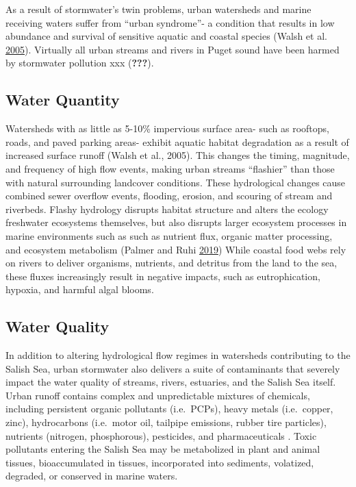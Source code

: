 \documentclass[
]{report}
\begin{document}
As a result of stormwater's twin problems, urban watersheds and marine receiving waters suffer from ``urban syndrome''- a condition that results in low abundance and survival of sensitive aquatic and coastal species (Walsh et al. \protect\hyperlink{ref-Walsh2005}{2005}). Virtually all urban streams and rivers in Puget sound have been harmed by stormwater pollution xxx ({\textbf{???}}).

\hypertarget{water-quantity}{%
\subsection{Water Quantity}\label{water-quantity}}

Watersheds with as little as 5-10\% impervious surface area- such as rooftops, roads, and paved parking areas- exhibit aquatic habitat degradation as a result of increased surface runoff (Walsh et al., 2005). This changes the timing, magnitude, and frequency of high flow events, making urban streams ``flashier'' than those with natural surrounding landcover conditions. These hydrological changes cause combined sewer overflow events, flooding, erosion, and scouring of stream and riverbeds. Flashy hydrology disrupts habitat structure and alters the ecology freshwater ecosystems themselves, but also disrupts larger ecosystem processes in marine environments such as such as nutrient flux, organic matter processing, and ecosystem metabolism (Palmer and Ruhi \protect\hyperlink{ref-Palmer2019}{2019}) While coastal food webs rely on rivers to deliver organisms, nutrients, and detritus from the land to the sea, these fluxes increasingly result in negative impacts, such as eutrophication, hypoxia, and harmful algal blooms.

\hypertarget{water-quality}{%
\subsection{Water Quality}\label{water-quality}}

In addition to altering hydrological flow regimes in watersheds contributing to the Salish Sea, urban stormwater also delivers a suite of contaminants that severely impact the water quality of streams, rivers, estuaries, and the Salish Sea itself. Urban runoff contains complex and unpredictable mixtures of chemicals, including persistent organic pollutants (i.e.~PCPs), heavy metals (i.e.~copper, zinc), hydrocarbons (i.e.~motor oil, tailpipe emissions, rubber tire particles), nutrients (nitrogen, phosphorous), pesticides, and pharmaceuticals . Toxic pollutants entering the Salish Sea may be metabolized in plant and animal tissues, bioaccumulated in tissues, incorporated into sediments, volatized, degraded, or conserved in marine waters.
\end{document}
